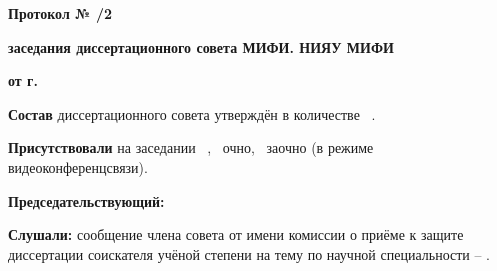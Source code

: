     \begin{tightcenter}
        \textbf{Протокол № /2}
        
        \textbf{заседания диссертационного совета МИФИ. НИЯУ МИФИ}
        
        \textbf{от  г.}
    \end{tightcenter}

    \vspace{10mm}
    
    \textbf{Состав} диссертационного совета утверждён в количестве \thedsmembers~\numtotexPeople{\value{dsmembers}}.
    
    \textbf{Присутствовали} на заседании \thedsfullacc~\numtotexPeople{\value{dsfullacc}}, \thedsoffacc~очно, \thedsonacc~заочно (в режиме видеоконференцсвязи).

    \textbf{Председательствующий:}  

    \textbf{Слушали:} сообщение члена совета   от имени комиссии о приёме к защите диссертации соискателя учёной степени   на тему  по научной специальности  – .

